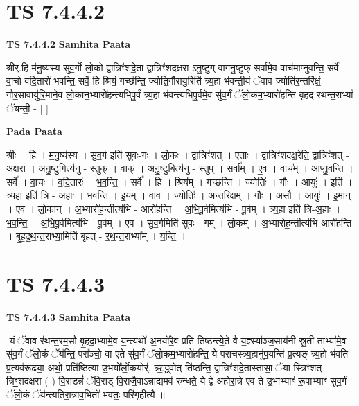 \documentclass[17pt]{extarticle}
\begin{document}

\section{ TS 7.4.4.2 }

\textbf{TS 7.4.4.2 } \newline
\textbf{Samhita Paata} \newline

श्रीर्.हि म॑नु॒ष्य॑स्य सुव॒र्गो लो॒को द्वात्रिꣳ॑शदे॒ता द्वात्रिꣳ॑शदक्षरा-ऽनु॒ष्टुग्-वाग॑नु॒ष्टुफ् सर्वा॑मे॒व वाच॑माप्नुवन्ति॒ सर्वे॑ वा॒चो व॑दि॒तारो॑ भवन्ति॒ सर्वे॒ हि श्रियं॒ गच्छ॑न्ति॒ ज्योति॒र्गौरायु॒रिति॑ त्र्य॒हा भ॑वन्ती॒यं ॅवाव ज्योति॑र॒न्तरि॑क्षं॒ गौर॒सावायु॑रि॒माने॒व लो॒कान॒भ्यारो॑हन्त्यभिपू॒र्वं त्र्य॒हा भ॑वन्त्यभिपू॒र्वमे॒व सु॑व॒र्गं ॅलो॒कम॒भ्यारो॑हन्ति बृहद्-रथन्त॒राभ्यां᳚ ॅयन्ती॒ - [  ] \newline

\textbf{Pada Paata} \newline

श्रीः । हि । म॒नु॒ष्य॑स्य । सु॒व॒र्ग इति॑ सुवः-गः । लो॒कः । द्वात्रिꣳ॑शत् । ए॒ताः । द्वात्रिꣳ॑शदक्ष॒रेति॒ द्वात्रिꣳ॑शत् - अ॒क्ष॒रा॒ । अ॒नु॒ष्टुगित्य॑नु - स्तुक् । वाक् । अ॒नु॒ष्टुबित्य॑नु - स्तुप् । सर्वा᳚म् । ए॒व । वाच᳚म् । आ॒प्नु॒व॒न्ति॒ । सर्वे᳚ । वा॒चः । व॒दि॒तारः॑ । भ॒व॒न्ति॒ । सर्वे᳚ । हि । श्रिय᳚म् । गच्छ॑न्ति । ज्योतिः॑ । गौः । आयुः॑ । इति॑ । त्र्य॒हा इति॑ त्रि - अ॒हाः । भ॒व॒न्ति॒ । इ॒यम् । वाव । ज्योतिः॑ । अ॒न्तरि॑क्षम् । गौः । अ॒सौ । आयुः॑ । इ॒मान् । ए॒व । लो॒कान् । अ॒भ्यारो॑ह॒न्तीत्य॑भि - आरो॑हन्ति । अ॒भि॒पू॒र्वमित्य॑भि - पू॒र्वम् । त्र्य॒हा इति॑ त्रि-अ॒हाः । भ॒व॒न्ति॒ । अ॒भि॒पू॒र्वमित्य॑भि - पू॒र्वम् । ए॒व । सु॒व॒र्गमिति॑ सुवः - गम् । लो॒कम् । अ॒भ्यारो॑ह॒न्तीत्य॑भि-आरो॑हन्ति । बृ॒ह॒द्र॒थ॒न्त॒राभ्या॒मिति॑ बृहत् - र॒थ॒न्त॒राभ्या᳚म् । य॒न्ति॒ ।  \newline





\section{ TS 7.4.4.3 }

\textbf{TS 7.4.4.3 } \newline
\textbf{Samhita Paata} \newline

-यं ॅवाव र॑थन्त॒रम॒सौ बृ॒हदा॒भ्यामे॒व य॒न्त्यथो॑ अ॒नयो॑रे॒व प्रति॑ तिष्ठन्त्ये॒ते वै य॒ज्ञ्स्या᳚ञ्ज॒साय॑नी स्रु॒ती ताभ्या॑मे॒व सु॑व॒र्गं ॅलो॒कं ॅय॑न्ति॒ परा᳚ञ्चो॒ वा ए॒ते सु॑व॒र्गं ॅलो॒कम॒भ्यारो॑हन्ति॒ ये परा॑चस्त्र्य॒हानु॑प॒यन्ति॑ प्र॒त्यङ् त्र्य॒हो भ॑वति प्र॒त्यव॑रूढ्या॒ अथो॒ प्रति॑ष्ठित्या उ॒भयो᳚र्लो॒कयोर्॑. ऋ॒द्ध्वोत् ति॑ष्ठन्ति॒ द्वात्रिꣳ॑शदे॒तास्तासां॒ ॅया स्त्रिꣳ॒॒शत् त्रिꣳ॒॒शद॑क्षरा ( ) वि॒राडन्नं॑ ॅवि॒राड् वि॒राजै॒वाऽन्नाद्य॒मव॑ रुन्धते॒ ये द्वे अ॑होरा॒त्रे ए॒व ते उ॒भाभ्याꣳ॑ रू॒पाभ्याꣳ॑ सुव॒र्गं ॅलो॒कं ॅय॑न्त्यतिरा॒त्राव॒भितो॑ भवतः॒ परि॑गृहीत्यै ॥ \newline
\end{document}
